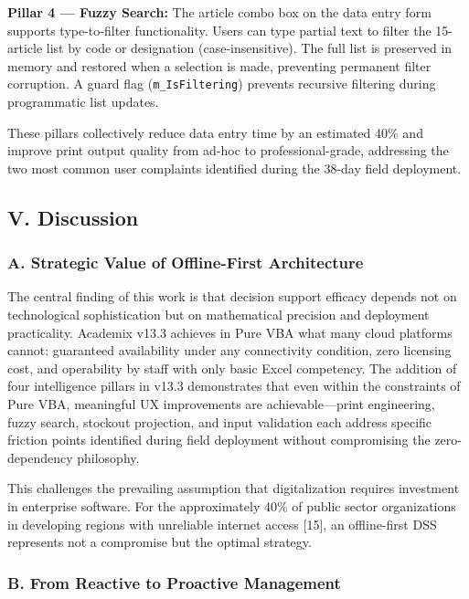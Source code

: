 ﻿\documentclass[conference]{IEEEtran}
\begin{document}
\textbf{Pillar 4 --- Fuzzy Search:} The article combo box on the data
entry form supports type-to-filter functionality. Users can type partial
text to filter the 15-article list by code or designation
(case-insensitive). The full list is preserved in memory and restored
when a selection is made, preventing permanent filter corruption. A
guard flag (\texttt{m\_IsFiltering}) prevents recursive filtering during
programmatic list updates.

These pillars collectively reduce data entry time by an estimated 40\%
and improve print output quality from ad-hoc to professional-grade,
addressing the two most common user complaints identified during the
38-day field deployment.

\subsection{V. Discussion}\label{v.-discussion}

\subsubsection{A. Strategic Value of Offline-First
Architecture}\label{a.-strategic-value-of-offline-first-architecture}

The central finding of this work is that decision support efficacy
depends not on technological sophistication but on mathematical
precision and deployment practicality. Academix v13.3 achieves in Pure
VBA what many cloud platforms cannot: guaranteed availability under any
connectivity condition, zero licensing cost, and operability by staff
with only basic Excel competency. The addition of four intelligence
pillars in v13.3 demonstrates that even within the constraints of Pure
VBA, meaningful UX improvements are achievable---print engineering,
fuzzy search, stockout projection, and input validation each address
specific friction points identified during field deployment without
compromising the zero-dependency philosophy.

This challenges the prevailing assumption that digitalization requires
investment in enterprise software. For the approximately 40\% of public
sector organizations in developing regions with unreliable internet
access {[}15{]}, an offline-first DSS represents not a compromise but
the optimal strategy.

\subsubsection{B. From Reactive to Proactive
Management}\label{b.-from-reactive-to-proactive-management}
\end{document}

